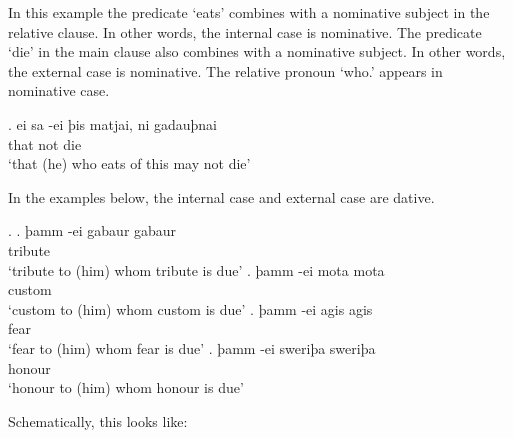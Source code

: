 In this example the predicate  `eats' combines with a nominative subject in the relative clause. In other words, the internal case is nominative. The predicate  `die' in the main clause also combines with a nominative subject. In other words, the external case is nominative. The relative pronoun  `who.' appears in nominative case.

\exg. ei sa -ei þis matjai, ni gadauþnai\\
 that     not die\scsub{[nom]}\\
 `that (he) who eats of this may not die' \label{ex:gothicnomnom}

In the examples below, the internal case and external case are dative.

\ex.
\ag. þamm -ei gabaur gabaur\\
    tribute\scsub{[dat]}\\
 `tribute to (him) whom tribute is due'
\bg. þamm -ei mota mota\\
    custom\scsub{[dat]}\\
 `custom to (him) whom custom is due'
\bg. þamm -ei agis agis\\
    fear\scsub{[dat]}\\
 `fear to (him) whom fear is due'
\bg. þamm -ei sweriþa sweriþa\\
    honour\scsub{[dat]}\\
 `honour to (him) whom honour is due' \label{ex:gothicdatdat}

Schematically, this looks like:

